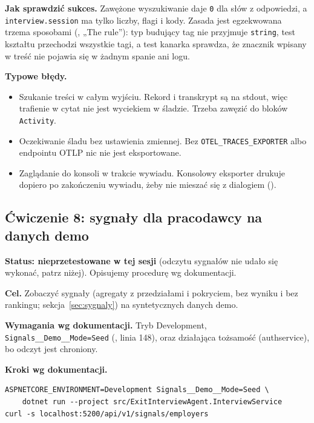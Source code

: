{\textbf{Jak sprawdzić sukces.} Zawężone wyszukiwanie daje \texttt{0} dla słów z
odpowiedzi, a \texttt{interview.session} ma tylko liczby, flagi i kody. Zasada
jest egzekwowana trzema sposobami (, „The rule”):
typ budujący tag nie przyjmuje \texttt{string}, test kształtu przechodzi wszystkie
tagi, a test kanarka sprawdza, że znacznik wpisany w treść nie pojawia się w żadnym
spanie ani logu.

\textbf{Typowe błędy.}
\begin{itemize}[leftmargin=*,itemsep=1pt]
  \item Szukanie treści w całym wyjściu. Rekord i transkrypt są na stdout, więc
        trafienie w cytat nie jest wyciekiem w śladzie. Trzeba zawęzić do bloków
        \texttt{Activity}.
  \item Oczekiwanie śladu bez ustawienia zmiennej. Bez \texttt{OTEL\_TRACES\_EXPORTER}
        albo endpointu OTLP nic nie jest eksportowane.
  \item Zaglądanie do konsoli w trakcie wywiadu. Konsolowy eksporter drukuje dopiero
        po zakończeniu wywiadu, żeby nie mieszać się z dialogiem
        ().
\end{itemize}

\subsection{Ćwiczenie 8: sygnały dla pracodawcy na danych demo}

\textbf{Status: nieprzetestowane w tej sesji} (odczytu sygnałów nie udało się
wykonać, patrz niżej). Opisujemy procedurę wg dokumentacji.

\textbf{Cel.} Zobaczyć sygnały (agregaty z przedziałami i pokryciem, bez wyniku i
bez rankingu; sekcja~\ref{sec:sygnaly}) na syntetycznych danych demo.

\textbf{Wymagania wg dokumentacji.} Tryb Development, \texttt{Signals\_\_Demo\_\_Mode=Seed}
(, linia 148), oraz działająca tożsamość
(authservice), bo odczyt jest chroniony.

\textbf{Kroki wg dokumentacji.}

\begin{Verbatim}[fontsize=\scriptsize,frame=single,framesep=2mm]
ASPNETCORE_ENVIRONMENT=Development Signals__Demo__Mode=Seed \
    dotnet run --project src/ExitInterviewAgent.InterviewService
curl -s localhost:5200/api/v1/signals/employers
\end{Verbatim}

}
